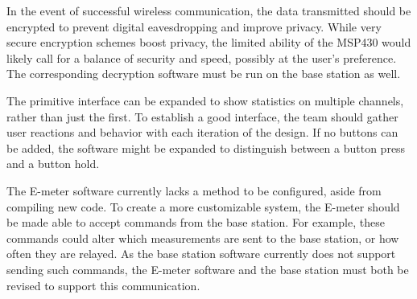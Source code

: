 In the event of successful wireless communication, the data
transmitted should be encrypted to prevent digital eavesdropping and
improve privacy. While very secure encryption schemes boost privacy,
the limited ability of the MSP430 would likely call for a balance of
security and speed, possibly at the user's preference. The
corresponding decryption software must be run on the base station as
well.

The primitive interface can be expanded to show statistics on multiple
channels, rather than just the first. To establish a good interface,
the team should gather user reactions and behavior with each iteration
of the design. If no buttons can be added, the software might be expanded
to distinguish between a button press and a button hold.

The E-meter software currently lacks a method to be configured, aside from
compiling new code. To create a more customizable system, the E-meter
should be made able to accept commands from the base station. For example,
these commands could alter which measurements are sent to the base station,
or how often they are relayed. As the base station software currently does
not support sending such commands, the E-meter software and the base
station must both be revised to support this communication.
